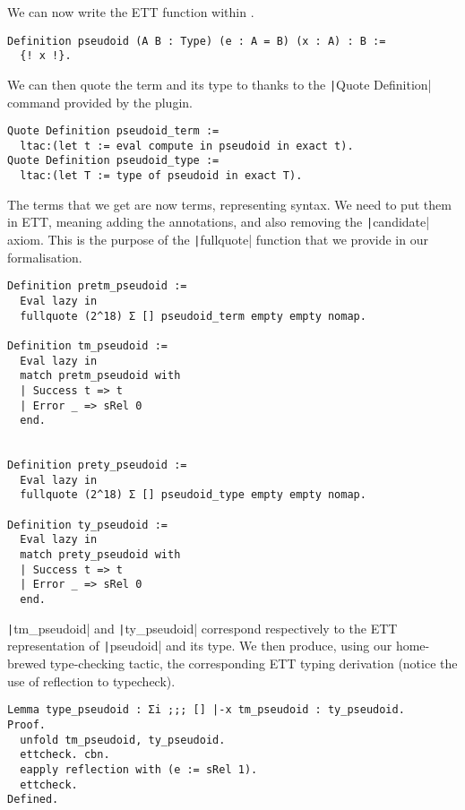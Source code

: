 We can now write the \acrshort{ETT} function within \Coq.
%
\begin{verbatim}
Definition pseudoid (A B : Type) (e : A = B) (x : A) : B :=
  {! x !}.
\end{verbatim}
%
We can then quote the term and its type to \MetaCoq thanks to the
\texttt|Quote Definition| command provided by the plugin.
%
\begin{verbatim}
Quote Definition pseudoid_term :=
  ltac:(let t := eval compute in pseudoid in exact t).
Quote Definition pseudoid_type :=
  ltac:(let T := type of pseudoid in exact T).
\end{verbatim}
%
The terms that we get are now \MetaCoq terms, representing \Coq syntax.
We need to put them in \acrshort{ETT}, meaning adding the annotations, and also
removing the \texttt|candidate| axiom.
This is the purpose of the \texttt|fullquote| function that we provide
in our formalisation.
%
\begin{verbatim}
Definition pretm_pseudoid :=
  Eval lazy in
  fullquote (2^18) Σ [] pseudoid_term empty empty nomap.

Definition tm_pseudoid :=
  Eval lazy in
  match pretm_pseudoid with
  | Success t => t
  | Error _ => sRel 0
  end.


Definition prety_pseudoid :=
  Eval lazy in
  fullquote (2^18) Σ [] pseudoid_type empty empty nomap.

Definition ty_pseudoid :=
  Eval lazy in
  match prety_pseudoid with
  | Success t => t
  | Error _ => sRel 0
  end.
\end{verbatim}
%
\texttt|tm_pseudoid| and \texttt|ty_pseudoid| correspond
respectively to the \acrshort{ETT} representation of \texttt|pseudoid|
and its type.
We then produce, using our home-brewed \ltac type-checking tactic, the
corresponding \acrshort{ETT} typing derivation (notice the use of reflection to
typecheck).
%
\begin{verbatim}
Lemma type_pseudoid : Σi ;;; [] |-x tm_pseudoid : ty_pseudoid.
Proof.
  unfold tm_pseudoid, ty_pseudoid.
  ettcheck. cbn.
  eapply reflection with (e := sRel 1).
  ettcheck.
Defined.
\end{verbatim}
